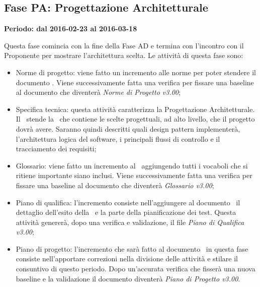 \documentclass[../PianoProgetto.tex]{subfiles}
\begin{document}
	\subsection{Fase PA: Progettazione Architetturale}
		\textbf{Periodo: dal 2016-02-23 al 2016-03-18}
		
		Questa fase comincia con la fine della Fase AD e termina con l'incontro con il Proponente per mostrare l'architettura scelta. Le attività di questa fase sono:
		\begin{itemize}
			\item Norme di progetto: viene fatto un incremento alle norme per poter stendere il documento \specificatecnica . Viene successivamente fatta una verifica per fissare una baseline al documento che diventerà \textit{Norme di Progetto v3.00};

			\item Specifica tecnica: questa attività caratterizza la Progettazione Architetturale. Il \progettista\ stende la \specificatecnica\ che contiene le scelte progettuali, ad alto livello, che il progetto dovrà avere. Saranno quindi descritti quali design pattern implementerà, l'architettura logica del software, i principali flussi di controllo e il tracciamento dei requisiti;

			\item Glossario: viene fatto un incremento al \glossario\ aggiungendo tutti i vocaboli che si ritiene importante siano inclusi. Viene successivamente fatta una verifica per fissare una baseline al documento che diventerà \textit{Glossario v3.00};

 			\item Piano di qualifica: l'incremento consiste nell'aggiungere al documento \pianodiqualifica\ il dettaglio dell'esito della \revisionedeirequisiti\ e la parte della pianificazione dei test. Questa attività genererà, dopo una verifica e validazione, il file \textit{Piano di Qualifica v3.00};

			\item Piano di progetto: l'incremento che sarà fatto al documento \pianodiprogetto\ in questa fase consiste nell'apportare correzioni nella divisione delle attività e stilare il consuntivo di questo periodo. Dopo un'accurata verifica che fisserà una nuova baseline e la validazione il documento diventerà \textit{Piano di Progetto v3.00}.
		\end{itemize}
		
\end{document}
